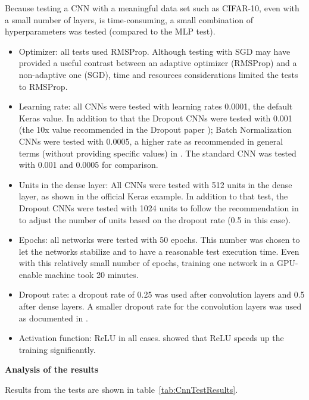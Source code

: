 \documentclass[../CAP6619_term_project_cgarbin.tex]{subfiles}
\begin{document}
Because testing a CNN with a meaningful data set such as CIFAR-10, even with a small number of layers, is time-consuming, a small combination of hyperparameters was tested (compared to the MLP test).

\begin{itemize}
\item Optimizer: all tests used RMSProp. Although testing with SGD may have provided a useful contrast between an adaptive optimizer (RMSProp) and a non-adaptive one (SGD), time and resources considerations limited the tests to RMSProp.
\item Learning rate: all CNNs were tested with learning rates 0.0001, the default Keras value. In addition to that the Dropout CNNs were tested with 0.001 (the 10x value recommended in the Dropout paper \cite{Srivastava2014}); Batch Normalization CNNs were tested with 0.0005, a higher rate as recommended in general terms (without providing specific values) in \cite{Ioffe2015}. The standard CNN was tested with 0.001 and 0.0005 for comparison.
\item Units in the dense layer: All CNNs were tested with 512 units in the dense layer, as shown in the official Keras example. In addition to that test, the Dropout CNNs were tested with 1024 units to follow the recommendation in \cite{Srivastava2014} to adjust the number of units based on the dropout rate (0.5 in this case).
\item Epochs: all networks were tested with 50 epochs. This number was chosen to let the networks stabilize and to have a reasonable test execution time. Even with this relatively small number of epochs, training one network in a GPU-enable machine took 20 minutes.
\item Dropout rate: a dropout rate of 0.25 was used after convolution layers and 0.5 after dense layers. A smaller dropout rate for the convolution layers was used as documented in \cite{Srivastava2014}.
\item Activation function: ReLU \cite{Nair2010} in all cases. \cite{Krizhevsky2012} showed that ReLU speeds up the training significantly.
\end{itemize}

\medskip
\textbf{Analysis of the results}

Results from the tests are shown in table~\ref{tab:CnnTestResults}.
\end{document}
